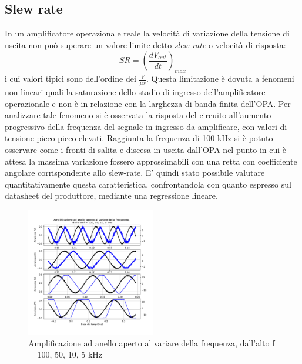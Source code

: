 \documentclass[journal]{IEEEtran}
\begin{document}
\subsection{\textbf{Slew rate}}
In un amplificatore operazionale reale la velocità di variazione della tensione di uscita non può superare un valore limite detto \textit{slew-rate} o velocità di risposta:
\begin{equation}
    SR = (\frac{dV_{out}}{dt})_{max}
\end{equation}
i cui valori tipici sono dell'ordine dei $\frac{V}{\mu s}$.
Questa limitazione è dovuta a fenomeni non lineari quali la saturazione dello stadio di ingresso dell'amplificatore operazionale e non è in relazione con la larghezza di banda finita dell'OPA. 
Per analizzare tale fenomeno si è osservata la risposta del circuito all'aumento progressivo della frequenza del segnale in ingresso da amplificare, con valori di tensione picco-picco elevati. Raggiunta la frequenza di 100 kHz si è potuto osservare come i fronti di salita e discesa in uscita dall'OPA nel punto in cui è attesa la massima variazione fossero approssimabili con una retta con coefficiente angolare corrispondente allo slew-rate. E' quindi stato possibile valutare quantitativamente questa caratteristica, confrontandola con quanto espresso sul datasheet del produttore, mediante una regressione lineare.
\begin{figure}[H]%
\begin {center}
\includegraphics[width=0.50\textwidth]{analysis/output/OPA-open-loop-slew-rate.pdf}
\caption{Amplificazione ad anello aperto al variare della frequenza, dall'alto f = 100, 50, 10, 5 kHz}
\label{fig:slew-rate-table}
\end {center}
\end{figure}
\end{document}
